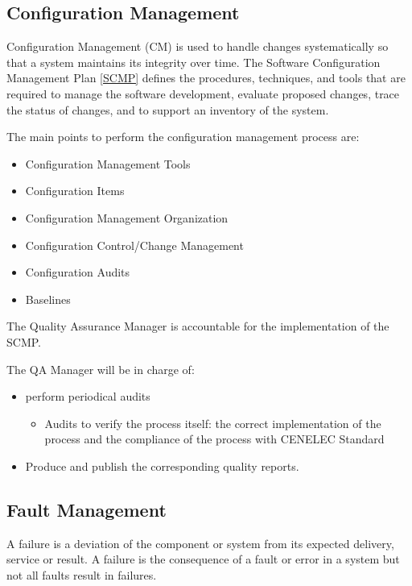 \documentclass{template/openetcs_article}
\begin{document}
\subsection{Configuration Management}

Configuration Management (CM) is used to handle changes systematically so that a system maintains its integrity over time. The Software Configuration Management Plan  \href{https://github.com/openETCS/governance/blob/master/SCMP/SCMP_0.0.0.pdf}{[SCMP]} \cite{scmp} defines the procedures, techniques, and tools that are required to manage the software development, evaluate proposed changes, trace the status of changes, and to support an inventory of the system. 

The main points to perform the configuration management process are:

\vspace{-10pt}
\begin{itemize}
\item Configuration Management Tools
\item Configuration Items
\item Configuration Management Organization
\item Configuration Control/Change Management
\item Configuration Audits
\item Baselines
\end{itemize}

The Quality Assurance Manager is accountable for the implementation of the \gls{SCMP}.

The QA Manager will be in charge of:
\begin{itemize}
\item perform periodical audits
\begin{itemize}
\item Audits to verify the process itself: the correct implementation of the process and the compliance of the process with CENELEC Standard
\end{itemize}
\item Produce and publish the corresponding quality reports.
\end{itemize}

\subsection{Fault Management}

A failure is a deviation of the component or system from its expected delivery, service or result. A failure is the consequence of a fault or error in a system but not all faults result in failures.
\end{document}
